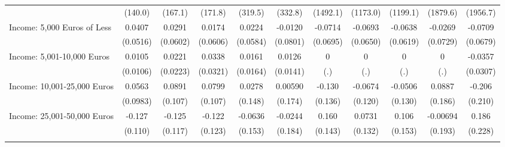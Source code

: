 {\begin{tabular}{l*{10}{c}}
            &     (140.0)         &     (167.1)         &     (171.8)         &     (319.5)         &     (332.8)         &    (1492.1)         &    (1173.0)         &    (1199.1)         &    (1879.6)         &    (1956.7)         \\
\addlinespace
Income: 5,000 Euros of Less&      0.0407         &      0.0291         &      0.0174         &      0.0224         &     -0.0120         &     -0.0714         &     -0.0693         &     -0.0638         &     -0.0269         &     -0.0709         \\
            &    (0.0516)         &    (0.0602)         &    (0.0606)         &    (0.0584)         &    (0.0801)         &    (0.0695)         &    (0.0650)         &    (0.0619)         &    (0.0729)         &    (0.0679)         \\
\addlinespace
Income: 5,001-10,000 Euros&      0.0105         &      0.0221         &      0.0338         &      0.0161         &      0.0126         &           0         &           0         &           0         &           0         &     -0.0357         \\
            &    (0.0106)         &    (0.0223)         &    (0.0321)         &    (0.0164)         &    (0.0141)         &         (.)         &         (.)         &         (.)         &         (.)         &    (0.0307)         \\
\addlinespace
Income: 10,001-25,000 Euros&      0.0563         &      0.0891         &      0.0799         &      0.0278         &     0.00590         &      -0.130         &     -0.0674         &     -0.0506         &      0.0887         &      -0.206         \\
            &    (0.0983)         &     (0.107)         &     (0.107)         &     (0.148)         &     (0.174)         &     (0.136)         &     (0.120)         &     (0.130)         &     (0.186)         &     (0.210)         \\
\addlinespace
Income: 25,001-50,000 Euros&      -0.127         &      -0.125         &      -0.122         &     -0.0636         &     -0.0244         &       0.160         &      0.0731         &       0.106         &    -0.00694         &       0.186         \\
            &     (0.110)         &     (0.117)         &     (0.123)         &     (0.153)         &     (0.184)         &     (0.143)         &     (0.132)         &     (0.153)         &     (0.193)         &     (0.228)         \\
\addlinespace

\end{tabular}}
